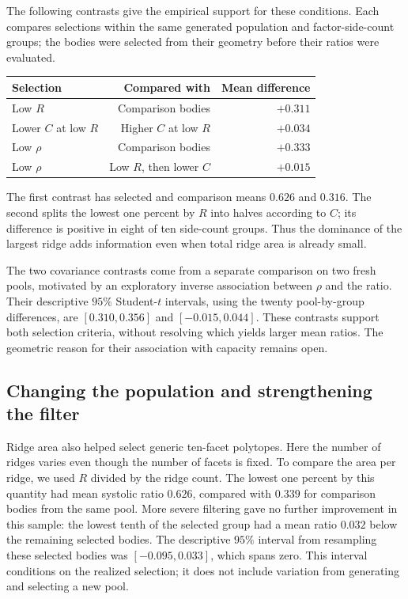 \begin{samepage}
The following contrasts give the empirical support for these conditions.
Each compares selections within the same generated population and
factor-side-count groups; the bodies were selected from their geometry
before their ratios were evaluated.
\begin{center}
\begin{tabular}{lrr}
\toprule
Selection & Compared with & Mean difference\\
\midrule
Low $R$ & Comparison bodies & $+0.311$\\
Lower $C$ at low $R$ & Higher $C$ at low $R$ & $+0.034$\\
Low $\rho$ & Comparison bodies & $+0.333$\\
Low $\rho$ & Low $R$, then lower $C$ & $+0.015$\\
\bottomrule
\end{tabular}
\end{center}
\end{samepage}
The first contrast has selected and comparison means $0.626$ and $0.316$.
The second splits the lowest one percent by $R$ into halves according to
$C$; its difference is positive in eight of ten side-count groups. Thus
the dominance of the largest ridge adds information even when total ridge
area is already small.

The two covariance contrasts come from a separate comparison on two
fresh pools, motivated by an exploratory inverse association between
$\rho$ and the ratio. Their descriptive $95\%$ Student-$t$ intervals,
using the twenty pool-by-group differences, are $[0.310,0.356]$ and
$[-0.015,0.044]$. These contrasts support both selection criteria,
without resolving which yields larger mean ratios. The geometric reason
for their association with capacity remains open.

\subsection{Changing the population and strengthening the filter}

Ridge area also helped select generic ten-facet polytopes. Here the number
of ridges varies even though the number of facets is fixed. To compare the
area per ridge, we used $R$ divided by the ridge count. The lowest one
percent by this quantity had mean systolic ratio $0.626$, compared with
$0.339$ for comparison bodies from the same pool. More severe filtering
gave no further improvement in this sample: the lowest tenth of the
selected group had a mean ratio $0.032$ below the remaining selected bodies.
The descriptive $95\%$ interval from resampling these selected bodies
was $[-0.095,0.033]$, which spans zero. This interval conditions
on the realized selection; it does not include variation from generating
and selecting a new pool.


